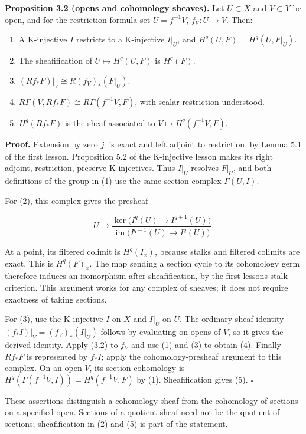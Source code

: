 \documentclass[
  english,
  11pt,
  a4paper,
]{article}
\providecommand{\tightlist}{%
  \setlength{\itemsep}{0pt}\setlength{\parskip}{0pt}}
\begin{document}
\textbf{Proposition 3.2 (opens and cohomology sheaves).} Let
\(U\subset X\) and \(V\subset Y\) be open, and for the restriction
formula set \(U=f^{-1}V\), \(f_V:U\to V\). Then:

\begin{enumerate}
\tightlist
\item
  A K-injective \(I\) restricts to a K-injective \(I|_U\), and
  \(H^q(U,F)=H^q(U,F|_U)\).
\item
  The sheafification of \(U\mapsto H^q(U,F)\) is \(H^q(F)\).
\item
  \((Rf_*F)|_V\cong R(f_V)_*(F|_U)\).
\item
  \(R\Gamma(V,Rf_*F)\cong R\Gamma(f^{-1}V,F)\), with scalar restriction
  understood.
\item
  \(H^q(Rf_*F)\) is the sheaf associated to \(V\mapsto H^q(f^{-1}V,F)\).
\end{enumerate}

\textbf{Proof.} Extension by zero \(j_!\) is exact and left adjoint to
restriction, by Lemma 5.1 of the first lesson. Proposition 5.2 of the
K-injective lesson makes its right adjoint, restriction, preserve
K-injectives. Thus \(I|_U\) resolves \(F|_U\), and both definitions of
the group in (1) use the same section complex \(\Gamma(U,I)\).

For (2), this complex gives the presheaf

\[U\longmapsto
\frac{\ker\bigl(I^q(U)\to I^{q+1}(U)\bigr)}
{\operatorname{im}\bigl(I^{q-1}(U)\to I^q(U)\bigr)}.
\tag{3.3}\]

At a point, its filtered colimit is \(H^q(I_x)\), because stalks and
filtered colimits are exact. This is \(H^q(F)_x\). The map sending a
section cycle to its cohomology germ therefore induces an isomorphism
after sheafification, by the first lesson\textquotesingle s stalk
criterion. This argument works for any complex of sheaves; it does not
require exactness of taking sections.

For (3), use the K-injective \(I\) on \(X\) and \(I|_U\) on \(U\). The
ordinary sheaf identity \((f_*I)|_V=(f_V)_*(I|_U)\) follows by
evaluating on opens of \(V\), so it gives the derived identity. Apply
(3.2) to \(f_V\) and use (1) and (3) to obtain (4). Finally \(Rf_*F\) is
represented by \(f_*I\); apply the cohomology-presheaf argument to this
complex. On an open \(V\), its section cohomology is
\(H^q(\Gamma(f^{-1}V,I))=H^q(f^{-1}V,F)\) by (1). Sheafification gives
(5). \(\square\)

These assertions distinguish a cohomology sheaf from the cohomology of
sections on a specified open. Sections of a quotient sheaf need not be
the quotient of sections; sheafification in (2) and (5) is part of the
statement.
\end{document}
